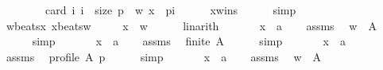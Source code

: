 \begin{isabellebody}
\ \ \ \ \ \ \ \ card\ {\isacharbraceleft}{\kern0pt}i{\isachardot}{\kern0pt}\ i\ {\isacharless}{\kern0pt}\ size\ p\ {\isasymand}\ {\isacharparenleft}{\kern0pt}w{\isacharcomma}{\kern0pt}\ x{\isacharparenright}{\kern0pt}\ {\isasymin}\ p{\isacharbang}{\kern0pt}i{\isacharbraceright}{\kern0pt}{\isachardoublequoteclose}\isanewline
\ \ \ \ \isamarkupfalse%
\ x{\isacharunderscore}{\kern0pt}wins\isanewline
\ \ \ \ \isamarkupfalse%
\ simp\isanewline
\ \ \isamarkupfalse%
\ w{\isacharunderscore}{\kern0pt}beats{\isacharunderscore}{\kern0pt}x\ x{\isacharunderscore}{\kern0pt}beats{\isacharunderscore}{\kern0pt}w\ \isamarkupfalse%
\isanewline
\ \ \ \ {\isachardoublequoteopen}x\ {\isacharequal}{\kern0pt}\ w{\isachardoublequoteclose}\isanewline
\ \ \ \ \isamarkupfalse%
\ linarith\isanewline
{}\isamarkupfalse%
\isanewline
\ \ \isamarkupfalse%
\isanewline
\ \ \ \ x\ {\isacharcolon}{\kern0pt}{\isacharcolon}{\kern0pt}\ {\isachardoublequoteopen}{\isacharprime}{\kern0pt}a{\isachardoublequoteclose}\isanewline
\ \ \isamarkupfalse%
\ assms\ \isamarkupfalse%
\ {\isachardoublequoteopen}w\ {\isasymin}\ A{\isachardoublequoteclose}\isanewline
\ \ \ \ \isamarkupfalse%
\ simp\isanewline
{}\isamarkupfalse%
\isanewline
\ \ \isamarkupfalse%
\isanewline
\ \ \ \ x\ {\isacharcolon}{\kern0pt}{\isacharcolon}{\kern0pt}\ {\isachardoublequoteopen}{\isacharprime}{\kern0pt}a{\isachardoublequoteclose}\isanewline
\ \ \isamarkupfalse%
\ assms\ \isamarkupfalse%
\ {\isachardoublequoteopen}finite\ A{\isachardoublequoteclose}\isanewline
\ \ \ \ \isamarkupfalse%
\ simp\isanewline
{}\isamarkupfalse%
\isanewline
\ \ \isamarkupfalse%
\isanewline
\ \ \ \ x\ {\isacharcolon}{\kern0pt}{\isacharcolon}{\kern0pt}\ {\isachardoublequoteopen}{\isacharprime}{\kern0pt}a{\isachardoublequoteclose}\isanewline
\ \ \isamarkupfalse%
\ assms\ \isamarkupfalse%
\ {\isachardoublequoteopen}profile\ A\ p{\isachardoublequoteclose}\isanewline
\ \ \ \ \isamarkupfalse%
\ simp\isanewline
{}\isamarkupfalse%
\isanewline
\ \ \isamarkupfalse%
\isanewline
\ \ \ \ x\ {\isacharcolon}{\kern0pt}{\isacharcolon}{\kern0pt}\ {\isachardoublequoteopen}{\isacharprime}{\kern0pt}a{\isachardoublequoteclose}\isanewline
\ \ \isamarkupfalse%
\ assms\ \isamarkupfalse%
\ {\isachardoublequoteopen}w\ {\isasymin}\ A{\isachardoublequoteclose}\isanewline

\end{isabellebody}
